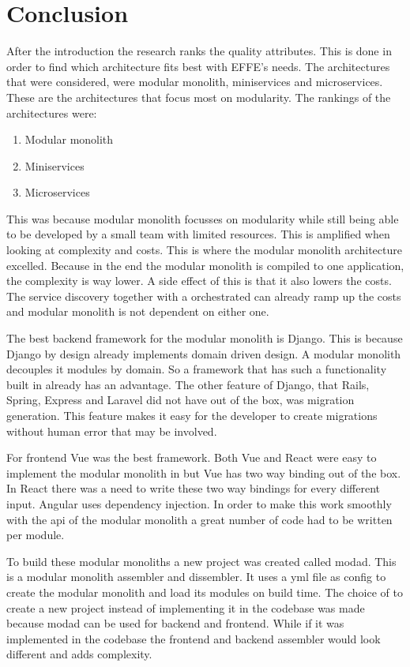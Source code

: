 \chapter{Conclusion}

After the introduction the research ranks the quality attributes. This is done in order to find which architecture fits best with EFFE's needs. The architectures that were considered, were modular monolith, miniservices and microservices. These are the architectures that focus most on modularity. The rankings of the architectures were:
\begin{enumerate}
  \item Modular monolith
  \item Miniservices
  \item Microservices
\end{enumerate}

This was because modular monolith focusses on modularity while still being able to be developed by a small team with limited resources. This is amplified when looking at complexity and costs. This is where the modular monolith architecture excelled. Because in the end the modular monolith is compiled to one application, the complexity is way lower. A side effect of this is that it also lowers the costs. The service discovery together with a orchestrated can already ramp up the costs and modular monolith is not dependent on either one.

The best backend framework for the modular monolith is Django. This is because Django by design already implements domain driven design. A modular monolith decouples it modules by domain. So a framework that has such a functionality built in already has an advantage. The other feature of Django, that Rails, Spring, Express and Laravel did not have out of the box, was migration generation. This feature makes it easy for the developer to create migrations without human error that may be involved.

For frontend Vue was the best framework. Both Vue and React were easy to implement the modular monolith in but Vue has two way binding out of the box. In React there was a need to write these two way bindings for every different input. Angular uses dependency injection. In order to make this work smoothly with the api of the modular monolith a great number of code had to be written per module.

To build these modular monoliths a new project was created called modad. This is a modular monolith assembler and dissembler. It uses a yml file as config to create the modular monolith and load its modules on build time. The choice of to create a new project instead of implementing it in the codebase was made because modad can be used for backend and frontend. While if it was implemented in the codebase the frontend and backend assembler would look different and adds complexity.
